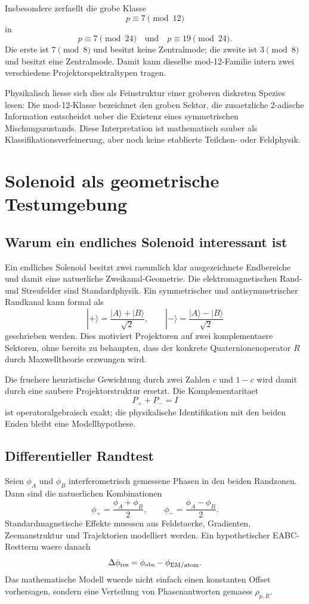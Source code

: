 \documentclass[11pt,a4paper]{article}
\theoremstyle{definition}
\begin{document}
Insbesondere zerfaellt die grobe Klasse
\[
p\equiv7\pmod{12}
\]
in
\[
p\equiv7\pmod{24}
\quad\text{und}\quad
p\equiv19\pmod{24}.
\]
Die erste ist $7\pmod8$ und besitzt keine Zentralmode; die zweite ist $3\pmod8$ und besitzt eine Zentralmode. Damit kann dieselbe mod-12-Familie intern zwei verschiedene Projektorspektraltypen tragen.

Physikalisch liesse sich dies als Feinstruktur einer groberen diskreten Spezies lesen: Die mod-12-Klasse bezeichnet den groben Sektor, die zusaetzliche 2-adische Information entscheidet ueber die Existenz eines symmetrischen Mischungszustands. Diese Interpretation ist mathematisch sauber als Klassifikationsverfeinerung, aber noch keine etablierte Teilchen- oder Feldphysik.

\section{Solenoid als geometrische Testumgebung}
\subsection{Warum ein endliches Solenoid interessant ist}
Ein endliches Solenoid besitzt zwei raeumlich klar ausgezeichnete Endbereiche und damit eine natuerliche Zweikanal-Geometrie. Die elektromagnetischen Rand- und Streufelder sind Standardphysik. Ein symmetrischer und antisymmetrischer Randkanal kann formal als
\[
|+\rangle=\frac{|A\rangle+|B\rangle}{\sqrt2},
\qquad
|-\rangle=\frac{|A\rangle-|B\rangle}{\sqrt2}
\]
geschrieben werden. Dies motiviert Projektoren auf zwei komplementaere Sektoren, ohne bereits zu behaupten, dass der konkrete Quaternionenoperator $R$ durch Maxwelltheorie erzwungen wird.

Die fruehere heuristische Gewichtung durch zwei Zahlen $c$ und $1-c$ wird damit durch eine saubere Projektorstruktur ersetzt. Die Komplementaritaet
\[
P_++P_-=I
\]
ist operatoralgebraisch exakt; die physikalische Identifikation mit den beiden Enden bleibt eine Modellhypothese.

\subsection{Differentieller Randtest}
Seien $\phi_A$ und $\phi_B$ interferometrisch gemessene Phasen in den beiden Randzonen. Dann sind die natuerlichen Kombinationen
\[
\phi_+=\frac{\phi_A+\phi_B}{2},
\qquad
\phi_-=\frac{\phi_A-\phi_B}{2}.
\]
Standardmagnetische Effekte muessen aus Feldstaerke, Gradienten, Zeemanstruktur und Trajektorien modelliert werden. Ein hypothetischer EABC-Restterm waere danach
\[
\Delta\phi_{\rm res}
=\phi_{\rm obs}-\phi_{\rm EM/atom}.
\]
Das mathematische Modell wuerde nicht einfach einen konstanten Offset vorhersagen, sondern eine Verteilung von Phasenantworten gemaess $\rho_{p,R}$.
\end{document}
